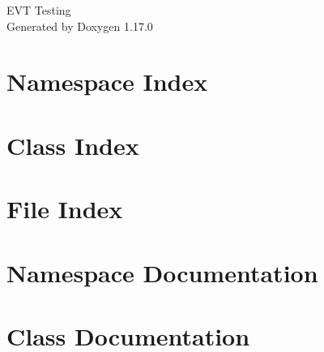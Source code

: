 \documentclass[twoside]{book}
\newcommand{\+}{\discretionary{\mbox{\scriptsize$\hookleftarrow$}}{}{}}
\newcommand{\clearemptydoublepage}{%
    \newpage{\pagestyle{empty}\cleardoublepage}%
  }
\begin{document}
  \raggedbottom
    \hypersetup{pageanchor=false,
                bookmarksnumbered=true,
                pdfencoding=unicode
               }
  \begin{titlepage}
  \vspace*{7cm}
  \begin{center}%
  {\Large EVT Testing}\\
  \vspace*{1cm}
  {\large Generated by Doxygen 1.17.0}\\
  \end{center}
  \end{titlepage}
  \clearemptydoublepage
  \tableofcontents
  \clearemptydoublepage
  \hypersetup{pageanchor=true}
\chapter{Namespace Index}

\chapter{Class Index}

\chapter{File Index}

\chapter{Namespace Documentation}



\chapter{Class Documentation}
















\end{document}
